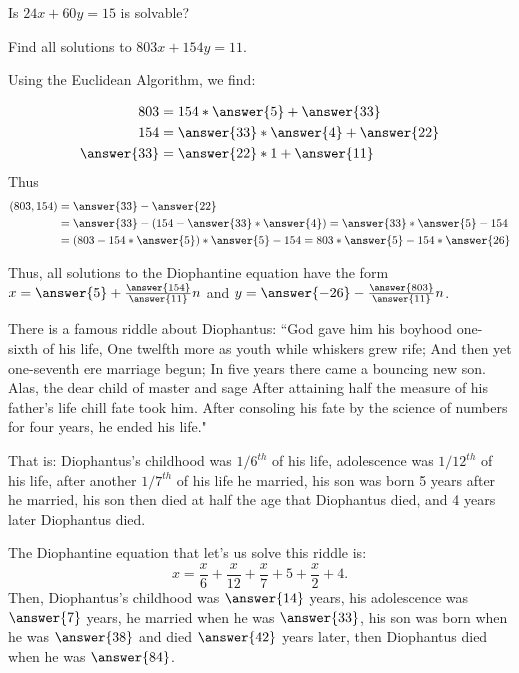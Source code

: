 \documentclass{ximera}
\begin{document}
   \begin{example}
   Is $24x+60y=15$ is solvable?
   \begin{multipleChoice}
   \end{multipleChoice}
   \end{example}
    
   \begin{example}
   Find all solutions to $803x+154y=11$.
    
   Using the Euclidean Algorithm, we find:
     
   \begin{align*}
    803&=154*\answer{5}+\answer{33}\\
    154&=\answer{33}*\answer{4}+\answer{22}\\
    \answer{33}&=\answer{22}*1+\answer{11}
   \end{align*}
   Thus
   \begin{align*}
    (803,154)&=\answer{33}-\answer{22}\\
    &=\answer{33}-(154-\answer{33}*\answer{4})=\answer{33}*\answer{5}-154\\
    &=(803-154*\answer{5})*\answer{5}-154=803*\answer{5}-154*\answer{26}
   \end{align*}
    
   Thus, all solutions to the Diophantine equation have the form $x=\answer{5}+\frac{\answer{154}}{\answer{11}}n$ and $y=\answer{-26}-\frac{\answer{803}}{\answer{11}}n$.
   \end{example}
    
   \begin{example}
        There is a famous riddle about Diophantus: ``God gave him his boyhood one-sixth of his life, One twelfth more as youth while whiskers grew rife; And then yet one-seventh ere marriage begun; In five years there came a bouncing new son. Alas, the dear child of master and sage After attaining half the measure of his father's life chill fate took him. After consoling his fate by the science of numbers for four years, he ended his life."
     
        That is: Diophantus's childhood was $1/6^{th}$ of his life, adolescence was $1/12^{th}$ of his life, after another $1/7^{th}$ of his life he married, his son was born 5 years after he married, his son then died at half the age that Diophantus died, and 4 years later Diophantus died.
     
        The Diophantine equation that let's us solve this riddle is: 
            \[
                x=\frac{x}{6}+\frac{x}{12}+\frac{x}{7}+5+\frac{x}{2}+4.
            \] 
        Then, Diophantus's childhood was $\answer{14}$ years, his adolescence was $\answer{7}$ years, he married when he was $\answer{33}$, his son was born when he was $\answer{38}$ and died $\answer{42}$ years later, then Diophantus died when he was $\answer{84}$.
   \end{example}
   
\end{document}
